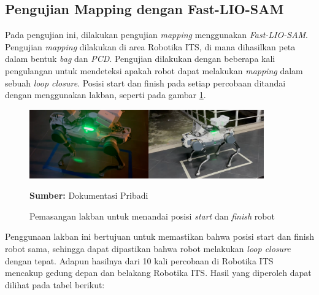 \subsection{Pengujian Mapping dengan Fast-LIO-SAM}

Pada pengujian ini, dilakukan pengujian \emph{mapping} menggunakan \emph{Fast-LIO-SAM}. Pengujian \emph{mapping} dilakukan di area Robotika ITS, di mana dihasilkan peta dalam bentuk \emph{bag} dan \emph{PCD}. Pengujian dilakukan dengan beberapa kali pengulangan untuk mendeteksi apakah robot dapat melakukan \emph{mapping} dalam sebuah \emph{loop closure}. Posisi start dan finish pada setiap percobaan ditandai dengan menggunakan lakban, seperti pada gambar \ref{fig:loop_closure}. 
\begin{figure}[H]
  \centering
  \includegraphics[width=0.9\textwidth]{gambar/bab4/map-start.png}
  \caption{Pemasangan lakban untuk menandai posisi \emph{start} dan \emph{finish} robot}
  \label{fig:loop_closure}
  \footnotesize{\textbf{Sumber:} Dokumentasi Pribadi}
\end{figure}

Penggunaan lakban ini bertujuan untuk memastikan bahwa posisi start dan finish robot sama, sehingga dapat dipastikan bahwa robot melakukan \emph{loop closure} dengan tepat. Adapun hasilnya dari 10 kali percobaan di Robotika ITS mencakup gedung depan dan belakang Robotika ITS. Hasil yang diperoleh dapat dilihat pada tabel berikut:

